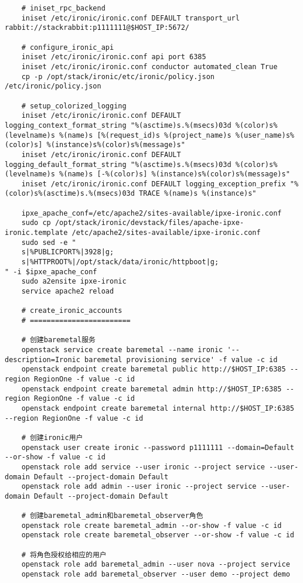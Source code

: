 \documentclass[a4paper,left=1.5cm,right=1.5cm,11pt]{article}
\begin{document}
\begin{lstlisting}
	# iniset_rpc_backend
	iniset /etc/ironic/ironic.conf DEFAULT transport_url rabbit://stackrabbit:p1111111@$HOST_IP:5672/

	# configure_ironic_api
	iniset /etc/ironic/ironic.conf api port 6385
    iniset /etc/ironic/ironic.conf conductor automated_clean True
	cp -p /opt/stack/ironic/etc/ironic/policy.json /etc/ironic/policy.json
	
	# setup_colorized_logging
	iniset /etc/ironic/ironic.conf DEFAULT logging_context_format_string "%(asctime)s.%(msecs)03d %(color)s%(levelname)s %(name)s [%(request_id)s %(project_name)s %(user_name)s%(color)s] %(instance)s%(color)s%(message)s"
    iniset /etc/ironic/ironic.conf DEFAULT logging_default_format_string "%(asctime)s.%(msecs)03d %(color)s%(levelname)s %(name)s [-%(color)s] %(instance)s%(color)s%(message)s"
	iniset /etc/ironic/ironic.conf DEFAULT logging_exception_prefix "%(color)s%(asctime)s.%(msecs)03d TRACE %(name)s %(instance)s"

	ipxe_apache_conf=/etc/apache2/sites-available/ipxe-ironic.conf
	sudo cp /opt/stack/ironic/devstack/files/apache-ipxe-ironic.template /etc/apache2/sites-available/ipxe-ironic.conf
	sudo sed -e "
	s|%PUBLICPORT%|3928|g;
	s|%HTTPROOT%|/opt/stack/data/ironic/httpboot|g;
" -i $ipxe_apache_conf
	sudo a2ensite ipxe-ironic
	service apache2 reload

	# create_ironic_accounts
	# ========================

	# 创建baremetal服务
    openstack service create baremetal --name ironic '--description=Ironic baremetal provisioning service' -f value -c id
	openstack endpoint create baremetal public http://$HOST_IP:6385 --region RegionOne -f value -c id
	openstack endpoint create baremetal admin http://$HOST_IP:6385 --region RegionOne -f value -c id
	openstack endpoint create baremetal internal http://$HOST_IP:6385 --region RegionOne -f value -c id
	
	# 创建ironic用户
	openstack user create ironic --password p1111111 --domain=Default --or-show -f value -c id
	openstack role add service --user ironic --project service --user-domain Default --project-domain Default
	openstack role add admin --user ironic --project service --user-domain Default --project-domain Default

	# 创建baremetal_admin和baremetal_observer角色
	openstack role create baremetal_admin --or-show -f value -c id
	openstack role create baremetal_observer --or-show -f value -c id

	# 将角色授权给相应的用户
	openstack role add baremetal_admin --user nova --project service
	openstack role add baremetal_observer --user demo --project demo
	\end{lstlisting}
\end{document}
